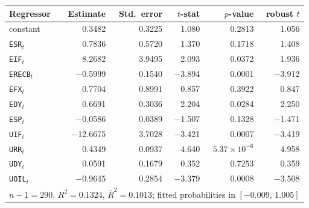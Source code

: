 \begin{tabular}{lrrrrr}
\toprule
Regressor & Estimate & Std.\ error & $t$-stat & $p$-value & robust $t$ \\
\midrule
constant & 0.3482 & 0.3225 & 1.080 & 0.2813 & 1.056 \\
\texttt{ESR}$_t$ & 0.7836 & 0.5720 & 1.370 & 0.1718 & 1.408 \\
\texttt{EIF}$_t$ & 8.2682 & 3.9495 & 2.093 & 0.0372 & 1.936 \\
\texttt{ERECB}$_t$ & \ensuremath{-}0.5999 & 0.1540 & \ensuremath{-}3.894 & 0.0001 & \ensuremath{-}3.912 \\
\texttt{EFX}$_t$ & 0.7704 & 0.8991 & 0.857 & 0.3922 & 0.847 \\
\texttt{EDY}$_t$ & 0.6691 & 0.3036 & 2.204 & 0.0284 & 2.250 \\
\texttt{ESP}$_t$ & \ensuremath{-}0.0586 & 0.0389 & \ensuremath{-}1.507 & 0.1328 & \ensuremath{-}1.471 \\
\texttt{UIF}$_t$ & \ensuremath{-}12.6675 & 3.7028 & \ensuremath{-}3.421 & 0.0007 & \ensuremath{-}3.419 \\
\texttt{URR}$_t$ & 0.4349 & 0.0937 & 4.640 & \ensuremath{5.37\times10^{-6}} & 4.958 \\
\texttt{UDY}$_t$ & 0.0591 & 0.1679 & 0.352 & 0.7253 & 0.359 \\
\texttt{UOIL}$_t$ & \ensuremath{-}0.9645 & 0.2854 & \ensuremath{-}3.379 & 0.0008 & \ensuremath{-}3.508 \\
\midrule
\multicolumn{6}{l}{\footnotesize $n-1=290$, $R^2=0.1324$, $\bar R^2=0.1013$; fitted probabilities in $[\ensuremath{-}0.009,\,1.005]$} \\
\bottomrule
\end{tabular}
